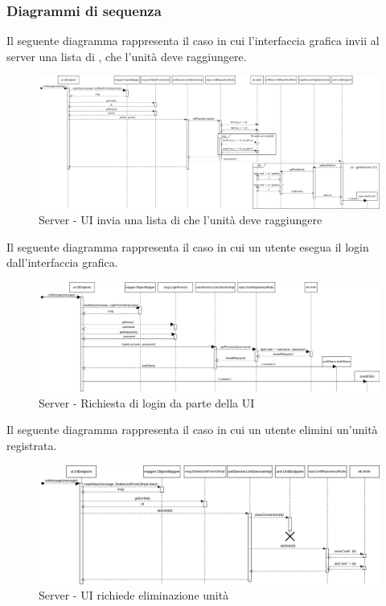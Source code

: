 		\begin{landscape}
			\subsubsection{Diagrammi di sequenza}
			Il seguente diagramma rappresenta il caso in cui l'interfaccia grafica invii al server una lista di , che l'unità deve raggiungere.\\
			\begin{figure}[H]
				\centering
				\includegraphics[width=25.7cm]{img/server_seq1.png}
				\caption{Server - UI invia una lista di  che l'unità deve raggiungere}
			\end{figure}
		\end{landscape}
		
		\newpage
		
		\begin{landscape}
			Il seguente diagramma rappresenta il caso in cui un utente esegua il login dall'interfaccia grafica.
			\begin{figure}[H]
				\centering
				\includegraphics[width=25.7cm]{img/server_seq2.png}
				\caption{Server - Richiesta di login da parte della UI}
			\end{figure}
		\end{landscape}

		\newpage

		\begin{landscape}
			Il seguente diagramma rappresenta il caso in cui un utente elimini un'unità registrata.
			\begin{figure}[H]
				\centering
				\includegraphics[width=25.7cm]{img/server_seq3.png}
				\caption{Server - UI richiede eliminazione unità}
			\end{figure}
		\end{landscape}
	
